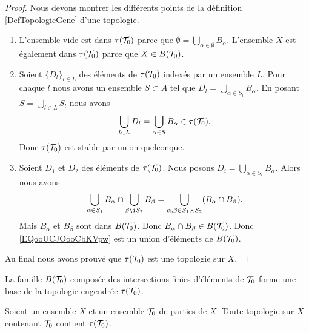 \begin{proof}
    Nous devons montrer les différents points de la définition \ref{DefTopologieGene} d'une topologie.
    \begin{enumerate}
        \item
            L'ensemble vide est dans \( \tau(\mathcal{T}_0)\) parce que \( \emptyset=\bigcup_{\alpha\in \emptyset}B_{\alpha}\). L'ensemble \( X\) est également dans \( \tau(\mathcal{T}_0)\) parce que \( X\in B(\mathcal{T}_0)\).

        \item
            Soient \( \{ D_l \}_{l\in L}\) des éléments de \( \tau(\mathcal{T}_0)\) indexés par un ensemble \( L\). Pour chaque \( l\) nous avons un ensemble \( S\subset A\) tel que \( D_l=\bigcup_{\alpha\in S_l}B_{\alpha}\). En posant \( S=\bigcup_{l\in L}S_l\) nous avons
            \begin{equation}
                \bigcup_{l\in L} D_l=\bigcup_{\alpha\in S}B_{\alpha}\in \tau(\mathcal{T}_0).
            \end{equation}
            Donc \( \tau(\mathcal{T}_0)\) est stable par union quelconque.
        \item
            Soient \( D_1\) et \( D_2\) des éléments de \( \tau(\mathcal{T}_0)\). Nous posons \( D_i=\bigcup_{\alpha\in S_i}B_{\alpha}\). Alors nous avons
            \begin{equation}        \label{EQooUCJOooCbKVpw}
                \bigcup_{\alpha\in S_1}B_{\alpha}\cap\bigcup_{\beta\i S_2}B_{\beta}=\bigcup_{\alpha,\beta\in S_1\times S_2}(B_{\alpha}\cap B_{\beta}).
            \end{equation}
            Mais \( B_{\alpha}\) et \( B_{\beta}\) sont dans \( B(\mathcal{T}_0)\). Donc \( B_{\alpha}\cap B_{\beta}\in B(\mathcal{T}_0)\). Donc \eqref{EQooUCJOooCbKVpw} est un union d'éléments de \( B(\mathcal{T}_0)\).
    \end{enumerate}
    Au final nous avons prouvé que \( \tau(\mathcal{T}_0)\) est une topologie sur \( X\).
\end{proof}

\begin{remark}
  La famille \( B(\mathcal{T}_0)\) composée des intersections finies d'éléments de \( \mathcal{T}_0 \) forme une base de la topologie engendrée \( \tau(\mathcal{T}_0)\).
\end{remark}

\begin{lemma}
    Soient un ensemble \( X\) et un ensemble \( \mathcal{T}_0\) de parties de \( X\). Toute topologie sur \( X\) contenant \( \mathcal{T}_0\) contient \( \tau(\mathcal{T}_0)\).
\end{lemma}

